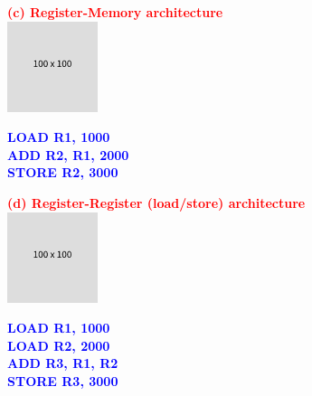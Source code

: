 \documentclass[
  14pt,
  a4paper,
  DIV=11,
  numbers=noendperiod,
  headinclude=true,
  footinclude=true]{scrreprt}
\begin{document}
\begin{figure}

\begin{minipage}{0.65\linewidth}
\textcolor{red}{\textbf{(c) Register-Memory architecture}}\\
\includegraphics{index_files/mediabag/FiKGhYhhIWJYiBgWIoaF.png}\end{minipage}%
%
\begin{minipage}{0.35\linewidth}

\begin{tcolorbox}[colback=boxbodycol, colframe=boxbodycol]
\textcolor{blue}{\textbf{LOAD R1, 1000}}\\
\textcolor{blue}{\textbf{ADD R2, R1, 2000}}\\
\textcolor{blue}{\textbf{STORE R2, 3000}}

\end{tcolorbox}

\end{minipage}%

\end{figure}%

\begin{figure}

\begin{minipage}{0.65\linewidth}
\textcolor{red}{\textbf{(d) Register-Register (load/store)
architecture}}\\
\includegraphics{index_files/mediabag/FiKGhYhhIWJYiBgWIoaF.png}\end{minipage}%
%
\begin{minipage}{0.35\linewidth}

\begin{tcolorbox}[colback=boxbodycol, colframe=boxbodycol]
\textcolor{blue}{\textbf{LOAD R1, 1000}}\\
\textcolor{blue}{\textbf{LOAD R2, 2000}}\\
\textcolor{blue}{\textbf{ADD R3, R1, R2}}\\
\textcolor{blue}{\textbf{STORE R3, 3000}}

\end{tcolorbox}

\end{minipage}%

\end{figure}%
\end{document}
